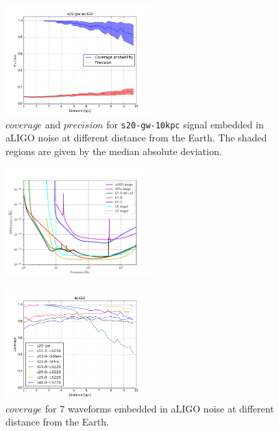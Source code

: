 \begin{figure}
  \centering
  \includegraphics[width=0.5\textwidth]{plots/s20-gw_covpbb_prec_aLIGO}
 \caption{$coverage$ and $precision$ for {\tt s20-gw-10kpc} signal embedded in aLIGO noise at different distance from the Earth. The shaded regions are given by the median absolute deviation.} \label{fig:s20results}
\end{figure}


\begin{figure}
 \centering
 \includegraphics[width=0.5\textwidth]{plots/spectrum}
 \caption{} \label{fig:spectrum}
\end{figure}

\begin{figure}
  \centering
  \includegraphics[width=0.5\textwidth]{plots/covppb_all_aLIGO}
 \caption{$coverage$ for 7 waveforms embedded in aLIGO noise at different distance from the Earth. } \label{fig:aLIGOall}
\end{figure}

